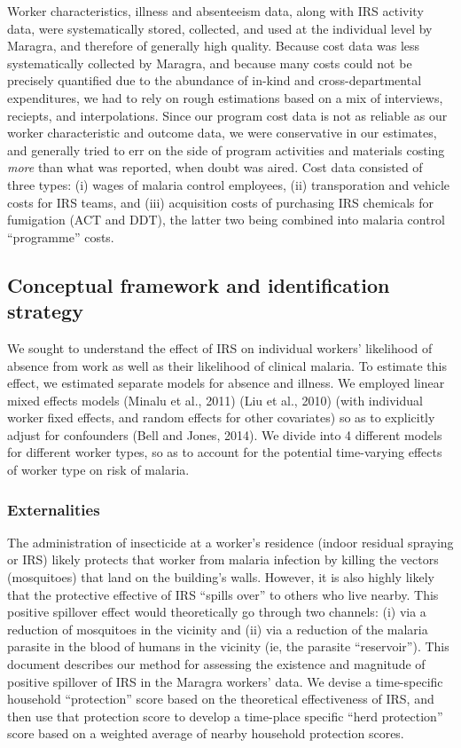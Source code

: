\documentclass[]{article}
\begin{document}
Worker characteristics, illness and absenteeism data, along with IRS
activity data, were systematically stored, collected, and used at the
individual level by Maragra, and therefore of generally high quality.
Because cost data was less systematically collected by Maragra, and
because many costs could not be precisely quantified due to the
abundance of in-kind and cross-departmental expenditures, we had to rely
on rough estimations based on a mix of interviews, reciepts, and
interpolations. Since our program cost data is not as reliable as our
worker characteristic and outcome data, we were conservative in our
estimates, and generally tried to err on the side of program activities
and materials costing \emph{more} than what was reported, when doubt was
aired. Cost data consisted of three types: (i) wages of malaria control
employees, (ii) transporation and vehicle costs for IRS teams, and (iii)
acquisition costs of purchasing IRS chemicals for fumigation (ACT and
DDT), the latter two being combined into malaria control ``programme''
costs.

\subsection{Conceptual framework and identification
strategy}\label{conceptual-framework-and-identification-strategy}

We sought to understand the effect of IRS on individual workers'
likelihood of absence from work as well as their likelihood of clinical
malaria. To estimate this effect, we estimated separate models for
absence and illness. We employed linear mixed effects models (Minalu et
al., 2011) (Liu et al., 2010) (with individual worker fixed effects, and
random effects for other covariates) so as to explicitly adjust for
confounders (Bell and Jones, 2014). We divide into 4 different models
for different worker types, so as to account for the potential
time-varying effects of worker type on risk of malaria.

\subsubsection{Externalities}\label{externalities}

The administration of insecticide at a worker's residence (indoor
residual spraying or IRS) likely protects that worker from malaria
infection by killing the vectors (mosquitoes) that land on the
building's walls. However, it is also highly likely that the protective
effective of IRS ``spills over'' to others who live nearby. This
positive spillover effect would theoretically go through two channels:
(i) via a reduction of mosquitoes in the vicinity and (ii) via a
reduction of the malaria parasite in the blood of humans in the vicinity
(ie, the parasite ``reservoir''). This document describes our method for
assessing the existence and magnitude of positive spillover of IRS in
the Maragra workers' data. We devise a time-specific household
``protection'' score based on the theoretical effectiveness of IRS, and
then use that protection score to develop a time-place specific ``herd
protection'' score based on a weighted average of nearby household
protection scores.
\end{document}
